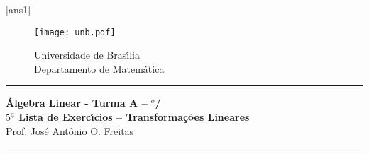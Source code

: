 \documentclass[12pt]{exam}
\newtheorem{exercicio}{}
\newcommand{\cp}[1]{\mathbb{#1}}
\newcommand{\vesp}[1]{\vspace{ #1  cm}}
\begin{document}

[ans1]

\begin{figure}[h]
        \begin{minipage}[c]{1.7cm}
        \texttt{[image: unb.pdf]}
        \end{minipage}%
        \hspace{0pt}
        \begin{minipage}[c]{4in}
          {Universidade de Bras{\'\i}lia} \\
          {Departamento de Matem{\'a}tica}
\end{minipage}
\end{figure}

\vesp{-0.35} \hrule

\begin{center}
{\Large\bf \'Algebra Linear - Turma A -- \semestre$^{o}$/\ano} \\ \vspace{9pt} {\large\bf
  $5^{\underline{a}}$ Lista de Exerc{\'\i}cios -- Transforma\c{c}\~oes Lineares}\\ \vspace{9pt} Prof. Jos{\'e} Ant{\^o}nio O. Freitas
\end{center}
\hrule

\vesp{.6}


\end{document}
